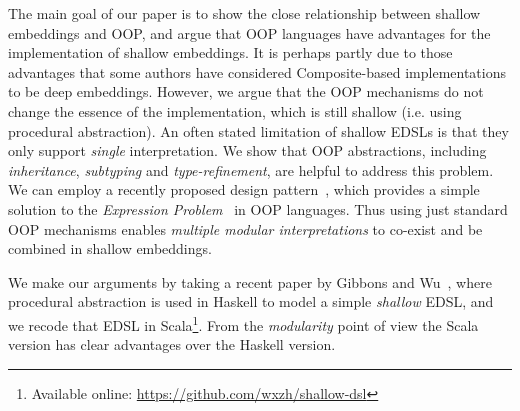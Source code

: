 The main goal of our paper is to show the close relationship between 
shallow embeddings and OOP, and argue that OOP languages have
advantages for the implementation of shallow embeddings. 
It is perhaps partly due to those advantages that some authors 
have considered  {\sc Composite}-based implementations to be deep
embeddings. However, we argue that the OOP
mechanisms do not change the essence of the implementation, which is
still shallow (i.e. using procedural abstraction).
An often stated limitation of shallow EDSLs is that they only support \emph{single} interpretation.
We show that OOP abstractions, including \emph{inheritance}, \emph{subtyping} and \emph{type-refinement}, are
helpful to address this problem.
We can employ a recently proposed design pattern~\cite{eptrivially16}, which provides a simple
solution to the \emph{Expression Problem}~\cite{expPb} in OOP languages. Thus
using just standard OOP mechanisms enables \emph{multiple modular
  interpretations} to co-exist and be combined in shallow embeddings.

We make our arguments by taking a recent paper by Gibbons and Wu~\cite{gibbons2014folding},
where procedural abstraction is used in Haskell to model a simple \emph{shallow}
EDSL, and we recode that EDSL in Scala\footnote{Available online: \url{https://github.com/wxzh/shallow-dsl}}.
From the \emph{modularity} point of view the
Scala version has clear advantages over the Haskell version.

\begin{comment}
In summary, our contributions are:

\begin{itemize}

\item {}

\item {\bf Multiple Modular Interpretations for Shallow Embeddings:} 
  We show that with standard OOP mechanisms it is easy to support multiple modular
  interpretations for shallow embeddings.

\item {\bf Transformations for Shallow Embeddings:} We show that
  transformations are encodable with recursive objects. Moreover, this technique
  can be ported back into functional programming as well.

\end{itemize}
\end{comment}

